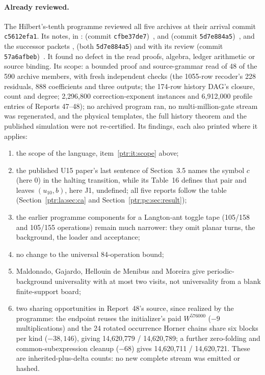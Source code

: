 \documentclass[11pt,letterpaper]{article}
\theoremstyle{definition}\newtheorem{definition}[theorem]{Definition}
\theoremstyle{remark}\newtheorem{remark}[theorem]{Remark}
\begin{document}
\paragraph{Already reviewed.} The Hilbert's-tenth programme reviewed all
five archives at their arrival commit \texttt{c5612efa1}. Its notes, in
:
 (commit
\texttt{cfbe37de7})~\cite{ptr:w:rev4048},
 and
 (commit
\texttt{5d7e884a5})~\cite{ptr:w:rev4748,ptr:w:share48}, and the successor
packets ,
 (both \texttt{5d7e884a5}) and
 with its review (commit
\texttt{57a6afbeb})~\cite{ptr:w:clean48}. It found no defect in the read
proofs, algebra, ledger arithmetic or source binding. Its scope: a bounded
proof and source-grammar read of 48 of the 590 archive members, with fresh
independent checks (the 1055-row recoder's 228 residuals, 888 coefficients
and three outputs; the 174-row history DAG's closure, count and degree;
2,296,800 correction-exponent instances and 6,912,000 profile entries of
Reports 47--48); no archived program ran, no multi-million-gate stream was
regenerated, and the physical templates, the full history theorem and the
published simulation were not re-certified. Its findings, each also printed
where it applies:
\begin{enumerate}[label=(\roman*)]
\item the scope of the language, item~\ref{ptr:it:scope} above;
\item the published U15 paper's last sentence of Section~3.5 names the
symbol $c$ (here 0) in the halting transition, while its Table~16 defines
that pair and leaves $(u_{10},b)$, here J1, undefined; all five reports
follow the table (Section~\ref{ptr:la:sec:ca} and
Section~\ref{ptr:pc:sec:result});
\item the earlier programme components for a Langton-ant toggle tape (105/158
and 105/155 operations) remain much narrower: they omit planar turns, the
background, the loader and acceptance;
\item no change to the universal 84-operation bound;
\item Maldonado, Gajardo, Hellouin de Menibus and Moreira give periodic-background
universality with at most two visits, not universality from a blank
finite-support board;
\item two sharing opportunities in Report~48's source, since realized by
the programme: the endpoint reuses the initializer's paid $W^{576000}$
($-9$ multiplications) and the 24 rotated occurrence Horner chains share six
blocks per kind ($-38{,}146$), giving 14,620,779 / 14,620,789; a further
zero-folding and common-subexpression cleanup ($-68$) gives
14,620,711 / 14,620,721. These are inherited-plus-delta counts: no new
complete stream was emitted or hashed.
\end{enumerate}
\end{document}
